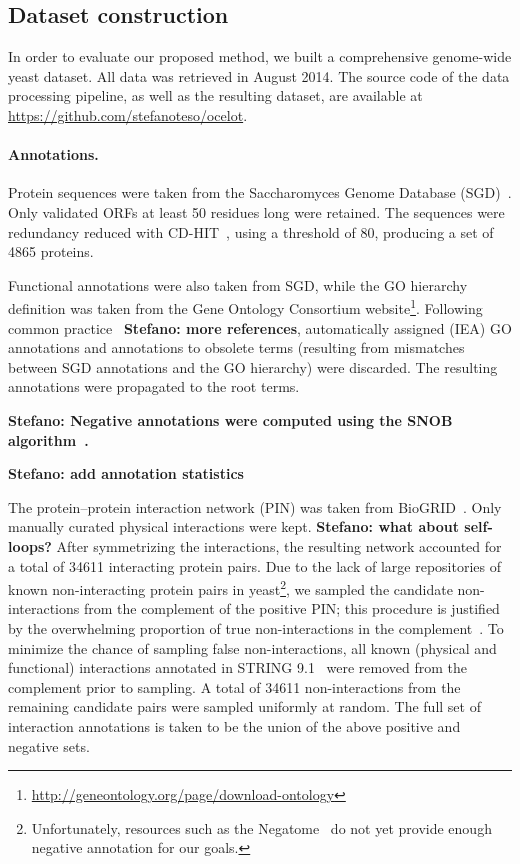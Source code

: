 \documentclass{bioinfo}
\newcommand{\stefano}[1]{{\bf \textcolor{alizarin}{{Stefano: #1}}}}
\begin{document}
\subsection{Dataset construction}

In order to evaluate our proposed method, we built a comprehensive genome-wide
yeast dataset. All data was retrieved in August 2014. The source code of the
data processing pipeline, as well as the resulting dataset, are available at
\url{https://github.com/stefanoteso/ocelot}.

\paragraph{Annotations.} Protein sequences were taken from the Saccharomyces
Genome Database (SGD)~\cite{cherry2012sgd}. Only validated ORFs at least 50
residues long were retained. The sequences were redundancy reduced with
CD-HIT~\cite{fu2012cdhit}, using a threshold of 80, producing a set of 4865
proteins.

Functional annotations were also taken from SGD, while the GO hierarchy
definition was taken from the Gene Ontology Consortium website\footnote{
\url{http://geneontology.org/page/download-ontology}}. Following common
practice~\cite{gong2016gofdr} \stefano{more references}, automatically assigned
(IEA) GO annotations and annotations to obsolete terms (resulting from
mismatches between SGD annotations and the GO hierarchy) were discarded.  The
resulting annotations were propagated to the root terms.

\stefano{Negative annotations were computed using the SNOB algorithm~\cite{youngs2014negative}.}

\stefano{add annotation statistics}

The protein--protein interaction network (PIN) was taken from
BioGRID~\cite{chatr2015biogrid}. Only manually curated physical interactions
were kept. \stefano{what about self-loops?} After symmetrizing the
interactions, the resulting network accounted for a total of 34611 interacting
protein pairs. Due to the lack of large repositories of known non-interacting
protein pairs in yeast\footnote{Unfortunately, resources such as the
Negatome~\cite{blohm2013negatome} do not yet provide enough negative annotation
for our goals.}, we sampled the candidate non-interactions from the
complement of the positive PIN; this procedure is justified by the overwhelming
proportion of true non-interactions in the
complement~\cite{park2011revisiting}. To minimize the chance of sampling false
non-interactions, all known (physical and functional) interactions annotated in
STRING 9.1~\cite{franceschini2013string91} were removed
from the complement prior to sampling.  A total of 34611 non-interactions from
the remaining candidate pairs were sampled uniformly at
random. The full set of interaction annotations is taken to be the union of the
above positive and negative sets.
\end{document}
